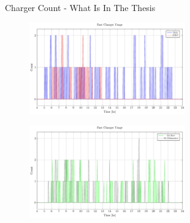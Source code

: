 \documentclass[bigger]{beamer}
\begin{document}
\begin{frame}[label={sec:org37af057}]{Charger Count - What Is In The Thesis}
\begin{figure}[htpb]
\centering
    \includegraphics[width=0.6\textwidth]{img/sa-pap-paper-bad/charger-count-fast-milp-qin}
\end{figure}
\begin{figure}[htpb]
\centering
    \includegraphics[width=0.6\textwidth]{img/sa-pap-paper-bad/charger-count-fast-sa}
\end{figure}
\end{frame}
\end{document}
